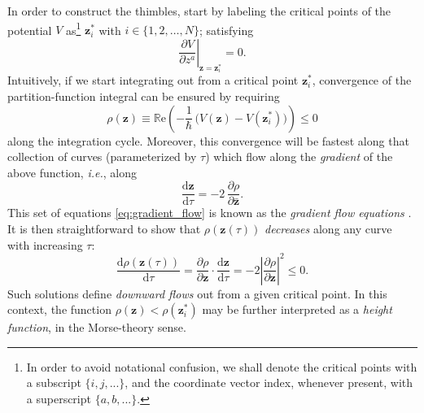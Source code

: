\documentclass[11pt,a4paper]{article}
\newcommand{\be}{\begin{equation}}
\newcommand{\ee}{\end{equation}}
\def\re{{\mathbb{R}}{\mathrm{e}}}
\newcommand{\rmd}{{\mathrm{d}}}
\begin{document}
In order to construct the thimbles, start by labeling the critical points of the potential $V$ as\footnote{In order to avoid notational confusion, we shall denote the critical points with a subscript $\{ i,j,... \}$, and the coordinate vector index, whenever present, with a superscript $\{ a,b,... \}$.} $\boldsymbol{z}^*_i$ with $i \in \{ 1, 2, \dots, N \}$; satisfying
%
\be
\left. \frac{\partial V}{\partial z^a} \right|_{\boldsymbol{z} = \boldsymbol{z}^*_i} = 0.
\ee
%
\noindent
Intuitively, if we start integrating out from a critical point $\boldsymbol{z}^*_i$, convergence of the partition-function integral can be ensured by requiring
%
\begin{equation}
\rho (\boldsymbol{z}) \equiv \re \left( - \frac{1}{\hbar}\, \Big( V (\boldsymbol{z}) - V (\boldsymbol{z}^*_i) \Big) \right) \leq 0
\end{equation}
%
\noindent
along the integration cycle. Moreover, this convergence will be fastest along that collection of curves (parameterized by $\tau$) which flow along the \textit{gradient} of the above function, \textit{i.e.}, along
%
\be
\label{eq:gradient_flow}
\frac{\rmd\boldsymbol{z}}{\rmd\tau} = - 2\, \frac{\partial\rho}{\partial\bar{\boldsymbol{z}}}.
\ee
%
\noindent
This set of equations \eqref{eq:gradient_flow} is known as the \textit{gradient flow equations} \cite{f77, k94}. It is then straightforward to show that $\rho \left( \boldsymbol{z}(\tau) \right)$ \textit{decreases} along any curve with increasing $\tau$:
%
\begin{equation}
\frac{\rmd \rho \left( \boldsymbol{z}(\tau) \right)}{\rmd\tau} = \frac{\partial\rho}{\partial\boldsymbol{z}} \cdot \frac{\rmd\boldsymbol{z}}{\rmd\tau} = - 2 \left| \frac{\partial\rho}{\partial\boldsymbol{z}} \right|^2 \leq 0.
\end{equation}
%
\noindent
Such solutions define \textit{downward flows} out from a given critical point. In this context, the function $\rho (\boldsymbol{z}) < \rho (\boldsymbol{z}^*_i)$ may be further interpreted as a \textit{height function}, in the Morse-theory sense.
\end{document}
